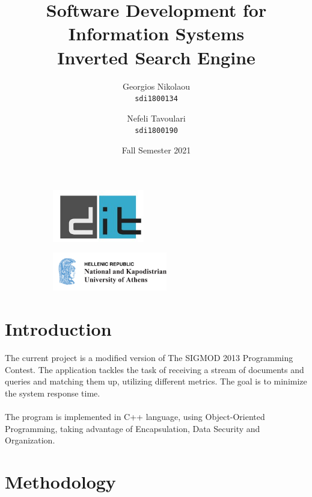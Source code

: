 \documentclass{article}
\title{%
\HUGE
Software Development for Information Systems \\  \LARGE Inverted Search Engine}
\begin{document}
\author{\Large
  Georgios Nikolaou\\
   \texttt{\large sdi1800134}
  \and
  \Large
  Nefeli Tavoulari\\
   \texttt{\large sdi1800190}
}
\date{Fall Semester 2021}
\maketitle


\begin{figure}
\centering
\begin{subfigure}
  \centering
  \includegraphics[width=40mm]{dit_logo}
  \label{fig:sub1}
\end{subfigure}%
\begin{subfigure}
  \centering
  \includegraphics[width=50mm]{NKUA_logo}
  \label{fig:sub2}
\end{subfigure}
\label{fig:test}
\end{figure}


\newpage
\tableofcontents
\newpage
\section{Introduction} \large
The current project is a modified version of The SIGMOD 2013 Programming Contest.
The application tackles the task of receiving a stream of documents and queries and matching them up, utilizing different metrics.
The goal is to minimize the system response time. \\ \\
The program is implemented in C++ language, using Object-Oriented Programming, taking advantage of Encapsulation, Data Security and Organization. \\ 

\section{Methodology}
\end{document}
